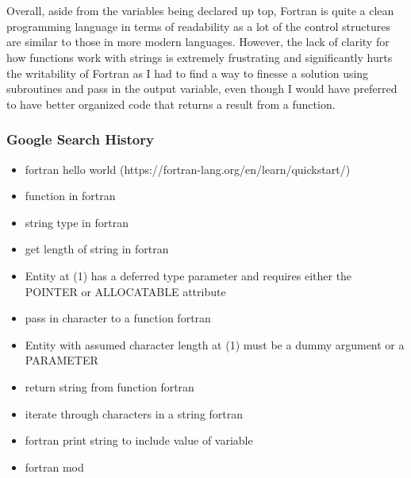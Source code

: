 \documentclass[letterpaper, 10pt, DIV=13]{scrartcl}
\numberwithin{equation}{section}
\numberwithin{figure}{section}
\numberwithin{table}{section}
\begin{document}
\\ \\
Overall, aside from the variables being declared up top, Fortran is quite a clean programming language in terms of readability as a lot of the control structures are similar to those in more modern languages. However, the lack of clarity for how functions work with strings is extremely frustrating and significantly hurts the writability of Fortran as I had to find a way to finesse a solution using subroutines and pass in the output variable, even though I would have preferred to have better organized code that returns a result from a function.

\subsubsection{Google Search History}

\begin{itemize}
	\item fortran hello world (https://fortran-lang.org/en/learn/quickstart/)
	\item function in fortran
	\item string type in fortran
	\item get length of string in fortran
	\item Entity at (1) has a deferred type parameter and requires either the POINTER or ALLOCATABLE attribute
	\item pass in character to a function fortran
	\item Entity with assumed character length at (1) must be a dummy argument or a PARAMETER
	\item return string from function fortran
	\item iterate through characters in a string fortran
	\item fortran print string to include value of variable
	\item fortran mod
\end{itemize}
\end{document}
